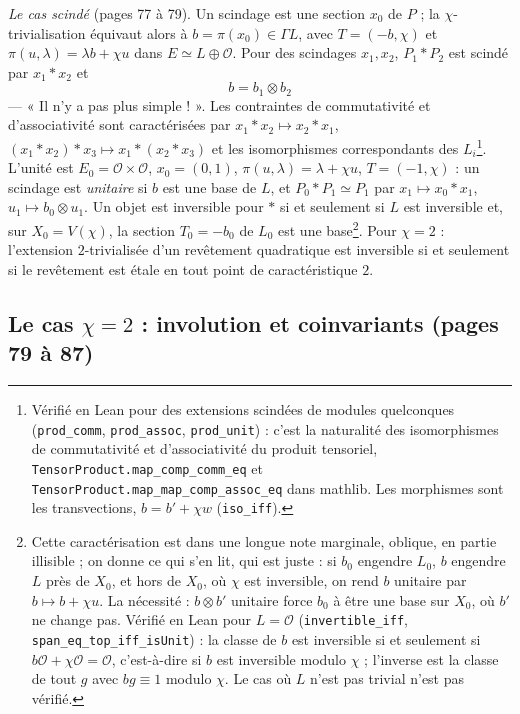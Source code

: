 \documentclass[11pt,a4paper]{article}
\begin{document}
\emph{Le cas scindé} (pages 77 à 79). Un scindage est une section $x_0$ de $P$ ; la
$\chi$-trivialisation équivaut alors à $b = \pi(x_0) \in \Gamma L$, avec
$T = (-b, \chi)$ et $\pi(u, \lambda) = \lambda b + \chi u$ dans $E \simeq L \oplus
\mathcal{O}$. Pour des scindages $x_1, x_2$, $P_1 * P_2$ est scindé par $x_1 * x_2$ et
\[
  b = b_1 \otimes b_2
\]
--- « Il n'y a pas plus simple ! ». Les contraintes de commutativité et
d'associativité sont caractérisées par $x_1 * x_2 \mapsto x_2 * x_1$, $(x_1 * x_2) * x_3
\mapsto x_1 * (x_2 * x_3)$ et les isomorphismes correspondants des $L_i$\footnote{Vérifié
en Lean pour des extensions scindées de modules quelconques
(\texttt{prod\_comm}, \texttt{prod\_assoc}, \texttt{prod\_unit}) : c'est la
naturalité des isomorphismes de commutativité et d'associativité du produit
tensoriel, \texttt{TensorProduct.map\_comp\_comm\_eq} et
\texttt{TensorProduct.map\_map\_comp\_assoc\_eq} dans mathlib. Les morphismes
sont les transvections, $b = b' + \chi w$ (\texttt{iso\_iff}).}. L'unité est
$E_0 = \mathcal{O} \times \mathcal{O}$, $x_0 = (0, 1)$, $\pi(u, \lambda) = \lambda + \chi u$,
$T = (-1, \chi)$ : un scindage est \emph{unitaire} si $b$ est une base de $L$, et
$P_0 * P_1 \simeq P_1$ par $x_1 \mapsto x_0 * x_1$, $u_1 \mapsto b_0 \otimes u_1$. Un objet
est inversible pour $*$ si et seulement si $L$ est inversible et, sur $X_0 =
V(\chi)$, la section $T_0 = -b_0$ de $L_0$ est une base\footnote{Cette
caractérisation est dans une longue note marginale, oblique, en partie illisible ;
on donne ce qui s'en lit, qui est juste : si $b_0$ engendre $L_0$, $b$ engendre $L$
près de $X_0$, et hors de $X_0$, où $\chi$ est inversible, on rend $b$ unitaire par
$b \mapsto b + \chi u$. La nécessité : $b \otimes b'$ unitaire force $b_0$ à être une
base sur $X_0$, où $b'$ ne change pas. Vérifié en Lean pour $L = \mathcal{O}$
(\texttt{invertible\_iff}, \texttt{span\_eq\_top\_iff\_isUnit}) : la classe de $b$
est inversible si et seulement si $b\mathcal{O} + \chi\mathcal{O} = \mathcal{O}$,
c'est-à-dire si $b$ est inversible modulo $\chi$ ; l'inverse est la classe de
tout $g$ avec $bg \equiv 1$ modulo $\chi$. Le cas où $L$ n'est pas trivial n'est
pas vérifié.}. Pour $\chi = 2$ : l'extension
$2$-trivialisée d'un revêtement quadratique est inversible si et seulement si le
revêtement est étale en tout point de caractéristique $2$.

\subsection*{Le cas $\chi = 2$ : involution et coinvariants (pages 79 à 87)}
\end{document}
